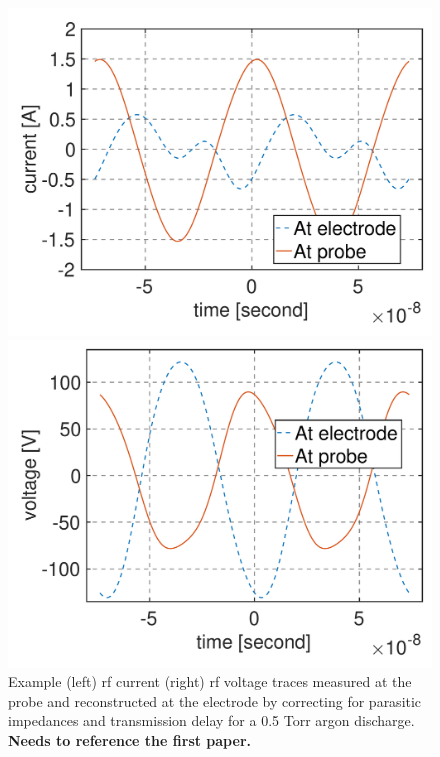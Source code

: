 \documentclass[12pt]{iopart}
\begin{document}
\begin{figure}[ht!]
\begin{center}
\begin{minipage}{0.495\textwidth}
    \includegraphics[width=1\textwidth]{electrode_vs_probe_current.pdf}
\end{minipage}
\begin{minipage}{0.495\textwidth}
    \includegraphics[width=1\textwidth]{electrode_vs_probe_voltage.pdf}
\end{minipage}
	\caption{Example (left) rf current (right) rf voltage traces measured at the probe and reconstructed at the electrode by correcting for parasitic impedances and transmission delay for a 0.5 Torr argon discharge. \textbf{Needs to reference the first paper.}}
	\label{Fig:Current_v_time}
\end{center}
\end{figure}
\end{document}
